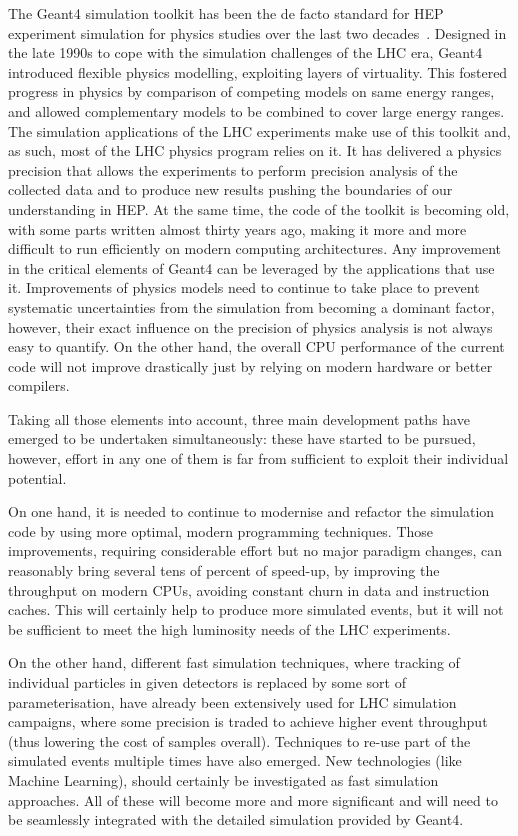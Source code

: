 \documentclass[11pt,a4paper]{article}
\begin{document}
The Geant4 simulation toolkit has been the de facto standard for HEP
experiment simulation for physics studies over the last two decades~\cite{Geant4-2003, Geant4-2006, Geant4-2016}.
Designed in the late 1990s to cope with the simulation challenges of the
LHC era, Geant4 introduced flexible physics modelling, exploiting layers
of virtuality. This fostered progress in physics by comparison of
competing models on same energy ranges, and allowed complementary models
to be combined to cover large energy ranges. The simulation applications
of the LHC experiments make use of this toolkit and, as such, most of
the LHC physics program relies on it. It has delivered a physics
precision that allows the experiments to perform precision analysis of
the collected data and to produce new results pushing the boundaries of
our understanding in HEP. At the same time, the code of the toolkit is
becoming old, with some parts written almost thirty years ago, making it
more and more difficult to run efficiently on modern computing
architectures. Any improvement in the critical elements of Geant4 can be
leveraged by the applications that use it. 
Improvements of physics models need to continue to take place to prevent
systematic uncertainties from the simulation from becoming a dominant
factor, however, their exact influence on the precision of physics
analysis is not always easy to quantify. On the other hand, the overall
CPU performance of the current code will not improve drastically just by
relying on modern hardware or better compilers. 

Taking all those elements into account, three main development paths have emerged to be
undertaken simultaneously: these have started to be pursued, however,
effort in any one of them is far from sufficient to exploit their
individual potential. 

On one hand, it is needed to continue to modernise
and refactor the simulation code by using more optimal, modern
programming techniques. Those improvements, requiring considerable
effort but no major paradigm changes, can reasonably bring several tens
of percent of speed-up, by improving the throughput on modern CPUs,
avoiding constant churn in data and instruction caches. This will
certainly help to produce more simulated events, but it will not be
sufficient to meet the high luminosity needs of the LHC experiments. 

On the other hand, different fast simulation techniques, where tracking of
individual particles in given detectors is replaced by some sort of
parameterisation, have already been extensively used for LHC simulation
campaigns, where some precision is traded to achieve higher event
throughput (thus lowering the cost of samples overall). Techniques to
re-use part of the simulated events multiple times have also emerged.
New technologies (like Machine Learning), should certainly be
investigated as fast simulation approaches. All of these will become
more and more significant and will need to be seamlessly integrated with
the detailed simulation provided by Geant4. 
\end{document}
